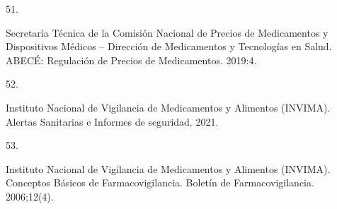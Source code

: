 \documentclass[
  oneside]{book}
\newlength{\cslhangindent}
\newlength{\csllabelwidth}
\newlength{\cslentryspacingunit} %
\newenvironment{CSLReferences}[2] %
 {%
  \setlength{\parindent}{0pt}
  \ifodd #1
  \let\oldpar\par
  \def\par{\hangindent=\cslhangindent\oldpar}
  \fi
  \setlength{\parskip}{#2\cslentryspacingunit}
 }%
 {}
\newcommand{\CSLLeftMargin}[1]{\parbox[t]{\csllabelwidth}{#1}}
\newcommand{\CSLRightInline}[1]{\parbox[t]{\linewidth - \csllabelwidth}{#1}\break}
\begin{document}
\begin{CSLReferences}{0}{0}
\leavevmode{}%
\CSLLeftMargin{51. }
\CSLRightInline{Secretaría Técnica de la Comisión Nacional de Precios de Medicamentos y Dispositivos Médicos -- Dirección de Medicamentos y Tecnologías en Salud. {ABEC{É}: Regulaci{ó}n de Precios de Medicamentos}. 2019:4.}

\leavevmode{}%
\CSLLeftMargin{52. }
\CSLRightInline{Instituto Nacional de Vigilancia de Medicamentos y Alimentos (INVIMA). {Alertas Sanitarias e Informes de seguridad}. 2021.}

\leavevmode{}%
\CSLLeftMargin{53. }
\CSLRightInline{Instituto Nacional de Vigilancia de Medicamentos y Alimentos (INVIMA). {Conceptos B{á}sicos de Farmacovigilancia}. Bolet{í}n de Farmacovigilancia. 2006;12(4).}

\end{CSLReferences}
\end{document}
